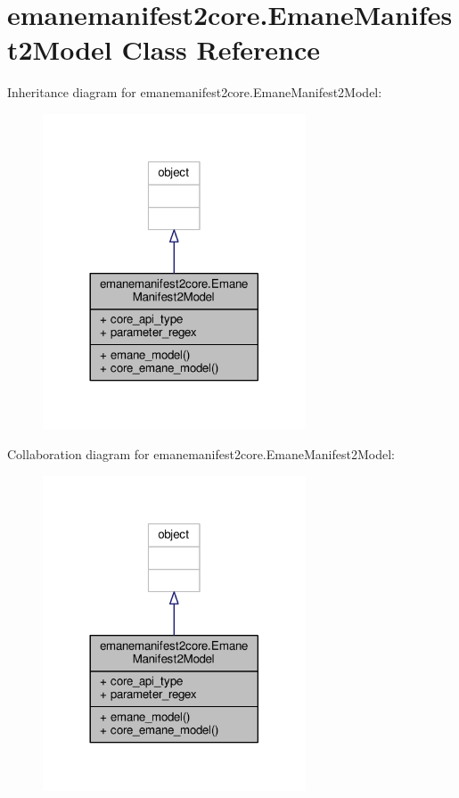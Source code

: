 \hypertarget{classemanemanifest2core_1_1_emane_manifest2_model}{\section{emanemanifest2core.\+Emane\+Manifest2\+Model Class Reference}
\label{classemanemanifest2core_1_1_emane_manifest2_model}
}


Inheritance diagram for emanemanifest2core.\+Emane\+Manifest2\+Model\+:
\nopagebreak
\begin{figure}[H]
\begin{center}
\leavevmode
\includegraphics[width=221pt]{classemanemanifest2core_1_1_emane_manifest2_model__inherit__graph}
\end{center}
\end{figure}


Collaboration diagram for emanemanifest2core.\+Emane\+Manifest2\+Model\+:
\nopagebreak
\begin{figure}[H]
\begin{center}
\leavevmode
\includegraphics[width=221pt]{classemanemanifest2core_1_1_emane_manifest2_model__coll__graph}
\end{center}
\end{figure}
